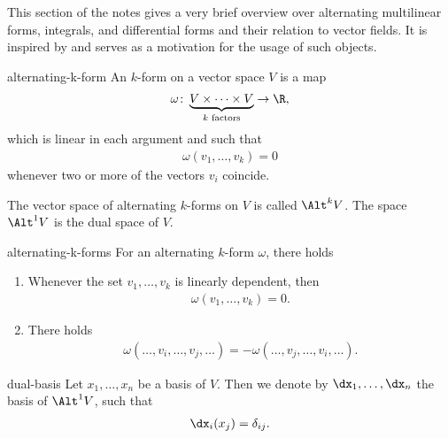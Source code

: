 \begin{intro}
  This section of the notes gives a very brief overview over
  alternating multilinear forms, integrals, and differential forms and
  their relation to vector fields. It is inspired by \cite{Hiptmair02}
  and serves as a motivation for the usage of such objects.
\end{intro}

\begin{Definition}{alternating-k-form}
  An  $k$-form on a vector space $V$ is a map
  \begin{gather}
    \omega\colon\underbrace{V\times \dots\times V}_{k \text{ factors}} \to \R,
  \end{gather}
  which is linear in each argument and such that
  \begin{gather}
    \omega(v_1,\dots,v_k) = 0
  \end{gather}
  whenever two or more of the vectors $v_i$ coincide.

  The vector space of alternating $k$-forms on $V$ is called
  $\Alt^k V$. The space $\Alt^1 V$ is the dual space of $V$.
\end{Definition}

\begin{Lemma}{alternating-k-forms}
  For an alternating $k$-form $\omega$, there holds
  \begin{enumerate}
  \item Whenever the set $v_1,\dots,v_k$ is linearly dependent, then
    \begin{gather}
      \omega(v_1,\dots,v_k) = 0.
    \end{gather}
  \item There holds
    \begin{gather}
      \omega(\ldots,v_i,\ldots,v_j,\ldots) = - \omega(\ldots,v_j,\ldots,v_i,\ldots).
    \end{gather}
  \end{enumerate}
\end{Lemma}

\begin{Notation}{dual-basis}
  Let $x_1,\dots,x_n$ be a basis of $V$. Then we denote by $\dx_1,\dots,\dx_n$ the basis of $\Alt^1V$,
  such that
  \begin{gather}
    \dx_i(x_j) = \delta_{ij}.
  \end{gather}
\end{Notation}


